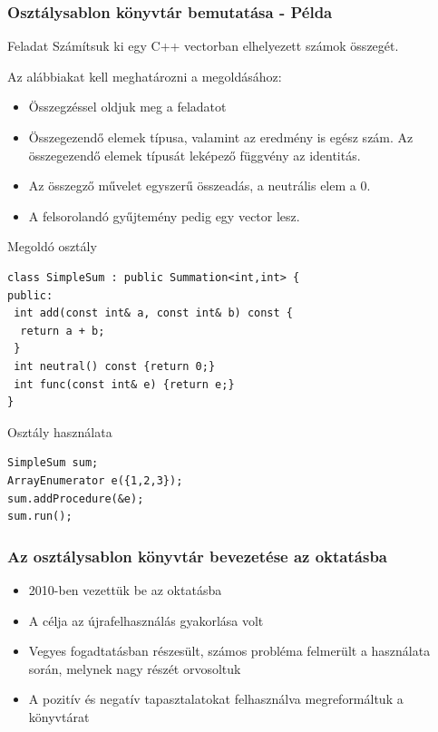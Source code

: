 \documentclass[11pt]{beamer}
\begin{document}
\begin{frame}[fragile]
	\frametitle{Osztálysablon könyvtár bemutatása - Példa}	
	\begin{block}{Feladat}
		Számítsuk ki egy C++ vectorban elhelyezett számok összegét.
	\end{block}
	
	Az alábbiakat kell meghatározni a megoldásához:
	\begin{itemize}
		\item Összegzéssel oldjuk meg a feladatot
		\item Összegezendő elemek típusa, valamint az eredmény is egész szám. Az összegezendő elemek típusát leképező függvény az identitás.
		\item Az összegző művelet egyszerű összeadás, a neutrális elem a 0.
		\item A felsorolandó gyűjtemény pedig egy vector lesz.
	\end{itemize}

	
\end{frame}

\begin{frame}[fragile]	
	\begin{block}{Megoldó osztály}
		\begin{lstlisting}[basicstyle=\small]
class SimpleSum : public Summation<int,int> {
public:
 int add(const int& a, const int& b) const {
  return a + b;
 }
 int neutral() const {return 0;}
 int func(const int& e) {return e;}
}
		\end{lstlisting}
	\end{block}
	
	\begin{block}{Osztály használata}
	  	\begin{lstlisting}[basicstyle=\small]
SimpleSum sum;
ArrayEnumerator e({1,2,3});
sum.addProcedure(&e);
sum.run();
		\end{lstlisting}
	\end{block}
\end{frame}

\begin{frame}
	\frametitle{Az osztálysablon könyvtár bevezetése az oktatásba}
	\begin{itemize}
		\item 2010-ben vezettük be az oktatásba
		\vspace*{2px}
		\item A célja az újrafelhasználás gyakorlása volt
		\vspace*{2px}
		\item Vegyes fogadtatásban részesült, számos probléma felmerült a használata során, melynek nagy részét orvosoltuk
		\vspace*{2px}
		\item A pozitív és negatív tapasztalatokat felhasználva megreformáltuk a könyvtárat
	\end{itemize}
\end{frame}
\end{document}
